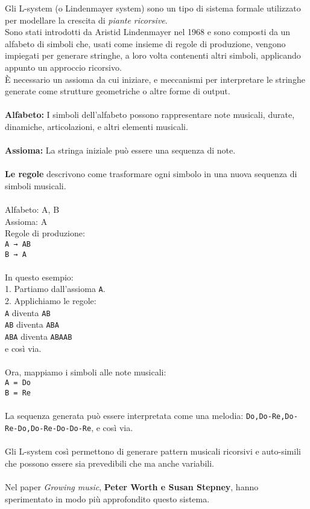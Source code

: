 \documentclass[a4paper,12pt]{report}
\begin{document}
Gli L-system (o Lindenmayer system) sono un tipo di sistema formale utilizzato per modellare la crescita di \textit{piante ricorsive}. \\
Sono stati introdotti da Aristid Lindenmayer nel 1968 e sono composti da un alfabeto di simboli che, usati come insieme di regole di produzione, vengono impiegati per generare stringhe, a loro volta contenenti altri simboli, applicando appunto un approccio ricorsivo. \\
È necessario un assioma da cui iniziare, e meccanismi per interpretare le stringhe generate come strutture geometriche o altre forme di output. \\
\\
\textbf{Alfabeto:} I simboli dell'alfabeto possono rappresentare note musicali, durate, dinamiche, articolazioni, e altri elementi musicali. \\
\\
\textbf{Assioma:} La stringa iniziale può essere una sequenza di note. \\
\\
\textbf{Le regole} descrivono come trasformare ogni simbolo in una nuova sequenza di simboli musicali. \\
\\
Alfabeto: {A, B} \\
Assioma: A \\
Regole di produzione: \\
  \texttt{A → AB} \\
  \texttt{B → A} \\
\\
In questo esempio: \\
1. Partiamo dall'assioma \texttt{A}. \\
2. Applichiamo le regole: \\
    \texttt{A} diventa \texttt{AB} \\
   \texttt{AB} diventa \texttt{ABA} \\
   \texttt{ABA} diventa \texttt{ABAAB} \\
   e così via. \\
\\
Ora, mappiamo i simboli alle note musicali: \\
\texttt{A = Do} \\
\texttt{B = Re} \\
\\
La sequenza generata può essere interpretata come una melodia: \texttt{Do,Do-Re,Do-Re-Do,Do-Re-Do-Do-Re}, e così via. \\
\\
Gli L-system così permettono di generare pattern musicali ricorsivi e auto-simili che possono essere sia prevedibili che ma anche variabili. \\
\\
Nel paper \textit{Growing music}, \textbf{Peter Worth e Susan Stepney}, hanno sperimentato in modo più approfondito questo sistema. \\
\end{document}
